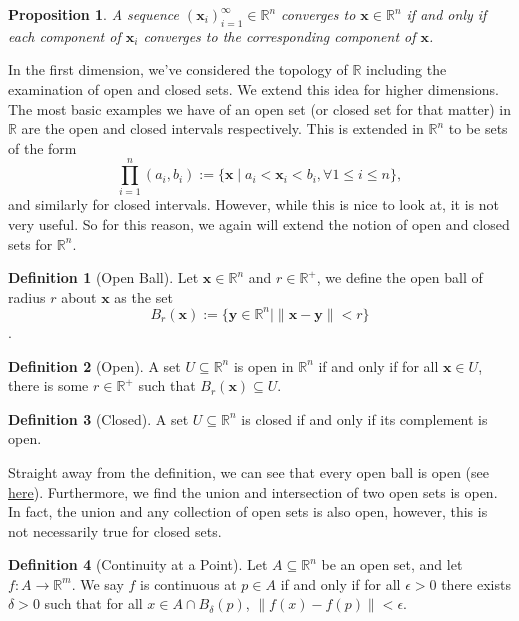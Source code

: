 \documentclass[
]{article}
\newtheorem{prop}{Proposition}
\theoremstyle{definition}
\newtheorem{definition}{Definition}[section]
\begin{document}
\begin{prop}
  A sequence \((\mathbf{x}_i)_{i = 1}^\infty \in \mathbb{R}^n\) converges to 
  \(\mathbf{x} \in \mathbb{R}^n\) if and only if each component of 
  \(\mathbf{x}_i\) converges to the corresponding component of \(\mathbf{x}\).
\end{prop}

In the first dimension, we've considered the topology of \(\mathbb{R}\)
including the examination of open and closed sets. We extend this idea
for higher dimensions. The most basic examples we have of an open set
(or closed set for that matter) in \(\mathbb{R}\) are the open and
closed intervals respectively. This is extended in \(\mathbb{R}^n\) to
be sets of the form \[
  \prod_{i = 1}^n (a_i, b_i) := \{\mathbf{x} \mid a_i < \mathbf{x}_i < b_i, 
  \forall 1 \le i \le n\},
\] and similarly for closed intervals. However, while this is nice to
look at, it is not very useful. So for this reason, we again will extend
the notion of open and closed sets for \(\mathbb{R}^n\).

\begin{definition} [Open Ball]
  Let \(\mathbf{x} \in \mathbb{R}^n\) and \(r \in \mathbb{R}^+\), we define the 
  open ball of radius \(r\) about \(\mathbf{x}\) as the set 
  \[B_r(\mathbf{x}) := \{\mathbf{y} \in \mathbb{R}^n \mid 
  \| \mathbf{x} - \mathbf{y}\| < r\}\].
\end{definition}
\begin{definition} [Open]
  A set \(U \subseteq \mathbb{  R}^n\) is open in \(\mathbb{R}^n\) if and only if 
  for all \(\mathbf{x} \in U\), there is some \(r \in \mathbb{R}^+\) such that 
  \(B_r(\mathbf{x}) \subseteq U\).
\end{definition}
\begin{definition}[Closed]
  A set \(U \subseteq \mathbb{R}^n\) is closed if and only if its complement is 
  open.
\end{definition}

Straight away from the definition, we can see that every open ball is
open (see
\href{https://github.com/JasonKYi/learn_mspaces/blob/master/src/metric_spaces/basic.lean\#L215}{here}).
Furthermore, we find the union and intersection of two open sets is
open. In fact, the union and any collection of open sets is also open,
however, this is not necessarily true for closed sets.

\begin{definition} [Continuity at a Point]
  Let \(A \subseteq \mathbb{R}^n\) be an open set, and let 
  \(f : A \to \mathbb{R}^m\). We say \(f\) is continuous at \(p \in A\) if and 
  only if for all \(\epsilon > 0\) there exists \(\delta > 0\) such that for all 
  \(x \in A \cap B_\delta(p)\), \(\| f(x) - f(p) \| < \epsilon\).
\end{definition}
\end{document}
